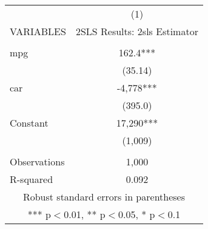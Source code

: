 \documentclass[]{article}
\begin{document}
\begin{tabular}{lc} \hline
 & (1) \\
VARIABLES & 2SLS Results: 2sls Estimator \\ \hline
 &  \\
mpg & 162.4*** \\
 & (35.14) \\
car & -4,778*** \\
 & (395.0) \\
Constant & 17,290*** \\
 & (1,009) \\
 &  \\
Observations & 1,000 \\
 R-squared & 0.092 \\ \hline
\multicolumn{2}{c}{ Robust standard errors in parentheses} \\
\multicolumn{2}{c}{ *** p$<$0.01, ** p$<$0.05, * p$<$0.1} \\
\end{tabular}
\end{document}
